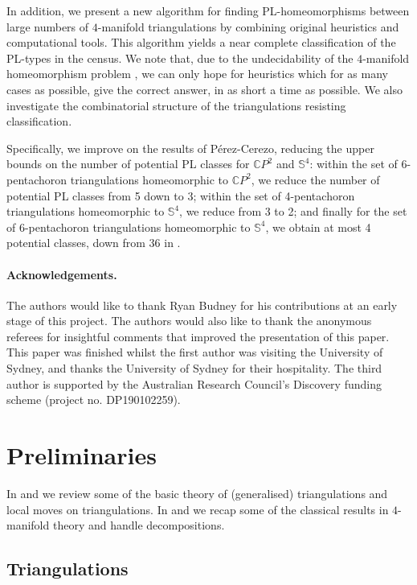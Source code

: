 \documentclass[pdflatex,sn-mathphys-num]{sn-jnl}
\theoremstyle{thmstyleone}%
\theoremstyle{thmstyletwo}%
\theoremstyle{thmstylethree}%
\newcommand{\cpp}{\mathbb{C}P^2}
\theoremstyle{remark}
\begin{document}
In addition, we present a new algorithm for finding PL-homeomorphisms between large numbers of $4$-manifold triangulations by combining original heuristics and computational tools. This algorithm yields a near complete classification of the PL-types in the census. 
We note that, due to the undecidability of the $4$-manifold homeomorphism problem \cite{Markov58}, we can only hope for heuristics which for as many cases as possible, give the correct answer, in as short a time as possible.
We also investigate the combinatorial structure of the triangulations resisting classification.

Specifically, we improve on the results of P\'erez-Cerezo, reducing the upper bounds on the number of potential PL classes for $\cpp$ and $\mathbb{S}^4$: within the set of 6-pentachoron triangulations homeomorphic to $\cpp$, we reduce the number of potential PL classes from 5 down to 3; within the set of 4-pentachoron triangulations homeomorphic to $\mathbb{S}^4$, we reduce from 3 to 2; and finally for the set of 6-pentachoron triangulations homeomorphic to $\mathbb{S}^4$, we obtain at most 4 potential classes, down from 36 in \cite{perez}.

\paragraph*{Acknowledgements.} The authors would like to thank Ryan Budney for his contributions at an early stage of this project. The authors would also like to thank the anonymous referees for insightful comments that improved the presentation of this paper. This paper was finished whilst the first author was visiting the University of Sydney, and thanks the University of Sydney for their hospitality. The third author is supported by the Australian Research Council’s Discovery funding scheme (project no. DP190102259).

\section{Preliminaries}\label{sec:bg}

In  and  we review some of the basic theory of (generalised) triangulations and local moves on triangulations. In  and  we recap some of the classical results in $4$-manifold theory and handle decompositions.  
        		
\subsection{Triangulations}\label{sec:prelims-triangulations}
\end{document}

